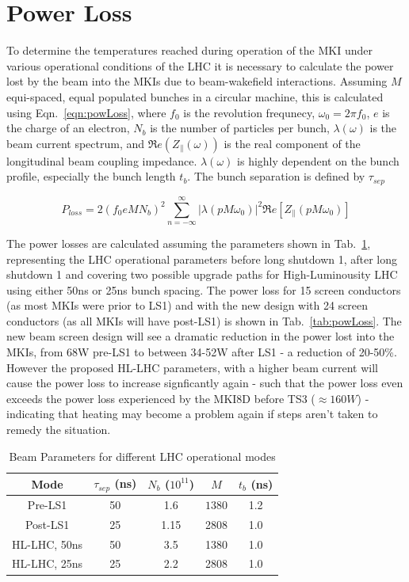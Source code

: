 \documentclass[a4paper,
              ]{jacow}
\begin{document}
\section{Power Loss}

To determine the temperatures reached during operation of the MKI under various operational conditions of the LHC it is necessary to calculate the power lost by the beam into the MKIs due to beam-wakefield interactions. Assuming $M$ equi-spaced, equal populated bunches in a circular machine, this is calculated using Eqn.~\ref{eqn:powLoss}, where $f_{0}$ is the revolution frequnecy, $\omega_{0}=2\pi f_{0}$, $e$ is the charge of an electron, $N_{b}$ is the number of particles per bunch, $\lambda(\omega)$ is the beam current spectrum, and $\Re{}e(Z_{\parallel}(\omega))$ is the real component of the longitudinal beam coupling impedance. $\lambda(\omega)$ is highly dependent on the bunch profile, especially the bunch length $t_{b}$. The bunch separation is defined by $\tau_{sep}$

\begin{equation}
P_{loss} = 2 \left( f_{0} e M  N_{b}\right)^{2} \displaystyle\sum\limits_{n = -\infty}^{\infty}  \left| \lambda \left( p M \omega_{0} \right)  \right|^{2} \Re{}e \left[ Z_{\parallel} \left( p M \omega_{0} \right) \right]
\label{eqn:powLoss}
\end{equation}

The power losses are calculated assuming the parameters shown in Tab.~\ref{tab:beamPara}, representing the LHC operational parameters before long shutdown 1, after long shutdown 1 and covering two possible upgrade paths for High-Luminousity LHC using either 50ns or 25ns bunch spacing. The power loss for 15 screen conductors (as most MKIs were prior to LS1) and with the new design with 24 screen conductors (as all MKIs will have post-LS1) is shown in Tab.~\ref{tab:powLoss}. The new beam screen design will see a dramatic reduction in the power lost into the MKIs, from 68W pre-LS1 to between 34-52W after LS1 - a reduction of 20-50\%. However the proposed HL-LHC parameters, with a higher beam current will cause the power loss to increase signficantly again - such that the power loss even exceeds the power loss experienced by the MKI8D before TS3 ($\approx 160W$) - indicating that heating may become a problem again if steps aren't taken to remedy the situation.

\begin{table}
\caption{Beam Parameters for different LHC operational modes}
\label{tab:beamPara}
\begin{center}
\begin{tabular}{c | c | c | c | c}
Mode & $\tau_{sep}$ (ns) & $N_{b}$ ($10^{11}$) & $ M $ & $t_{b}$ (ns) \\ \hline 
Pre-LS1 & 50 & 1.6 & $ 1380 $ & 1.2 \\ \hline 
Post-LS1 & 25 & 1.15 & 2808 & 1.0 \\ \hline 
HL-LHC, 50ns & 50 & 3.5 & 1380 & 1.0 \\ \hline 
HL-LHC, 25ns & 25 & 2.2 & 2808 & 1.0 \\ 
\end{tabular}
\end{center}
\end{table}
\end{document}

